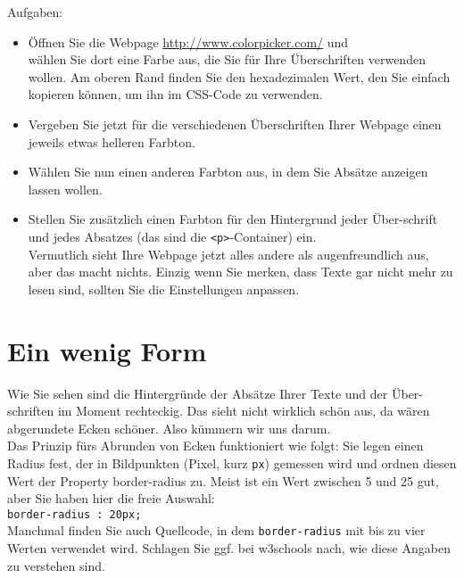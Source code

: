 Aufgaben:
\begin{itemize}
	\item Öffnen Sie die Webpage \url{http://www.colorpicker.com/} und \\wählen Sie dort eine Farbe aus, die Sie für Ihre Überschriften verwenden wollen. Am oberen Rand finden Sie den hexadezimalen Wert, den Sie einfach kopieren können, um ihn im CSS-Code zu verwenden.
	
	\item Vergeben Sie jetzt für die verschiedenen Überschriften Ihrer Webpage einen jeweils etwas helleren Farbton.
	
	\item Wählen Sie nun einen anderen Farbton aus, in dem Sie Absätze anzeigen lassen wollen.
	
	\item Stellen Sie zusätzlich einen Farbton für den Hintergrund jeder Über-schrift und jedes Absatzes (das sind die \verb|<p>|-Container) ein.\\
	
	Vermutlich sieht Ihre Webpage jetzt alles andere als augenfreundlich aus, aber das macht nichts. Einzig wenn Sie merken, dass Texte gar nicht mehr zu lesen sind, sollten Sie die Einstellungen anpassen.
\end{itemize}

\section{Ein wenig Form}

Wie Sie sehen sind die Hintergründe der Absätze Ihrer Texte und der Über-schriften im Moment rechteckig. Das sieht nicht wirklich schön aus, da wären abgerundete Ecken schöner. Also kümmern wir uns darum.\\

Das Prinzip fürs Abrunden von Ecken funktioniert wie folgt: Sie legen einen Radius fest, der in Bildpunkten (Pixel, kurz \verb|px|) gemessen wird und ordnen diesen Wert der Property border-radius zu. Meist ist ein Wert zwischen 5 und 25 gut, aber Sie haben hier die freie Auswahl:\\

\verb|border-radius : 20px;|\\

Manchmal finden Sie auch Quellcode, in dem \verb|border-radius| mit bis zu vier Werten verwendet wird. Schlagen Sie ggf. bei w3schools nach, wie diese Angaben zu verstehen sind.\\

